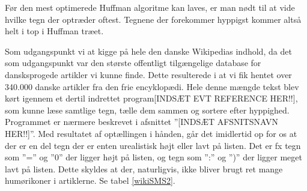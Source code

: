 

Før den mest optimerede Huffman algoritme kan laves, er man nødt til at vide hvilke tegn der optræder oftest. Tegnene der forekommer hyppigst kommer altså helt i top i Huffman træet.

Som udgangspunkt vi at kigge på hele den danske Wikipedias indhold, da det som udgangspunkt var den største offentligt tilgængelige database for dansksprogede artikler vi kunne finde. Dette resulterede i at vi fik hentet over 340.000 danske artikler fra den frie encyklopædi. Hele denne mængde tekst blev kørt igennem et dertil indrettet program[INDSÆT EVT REFERENCE HER!!], som kunne læse samtlige tegn, tælle dem sammen og sortere efter hyppighed. Programmet er nærmere beskrevet i afsnittet ”[INDSÆT AFSNITSNAVN HER!!]”.  Med resultatet af optællingen i hånden, går det imidlertid op for os at der er en del tegn der er enten urealistisk højt eller lavt på listen. Det er fx tegn som ”=” og ”0” der ligger højt på listen, og tegn som ”:” og ”)” der ligger meget lavt på listen. Dette skyldes at der, naturligvis, ikke bliver brugt ret mange humørikoner i artiklerne. Se tabel \ref{wikiSMS2}.

